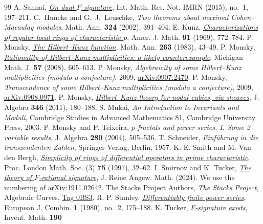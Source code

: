 \documentclass[11pt,a4paper,reqno]{amsart}
\numberwithin{equation}{section}
\theoremstyle{plain}
\begin{document}
\begin{thebibliography}{99}
A. Sannai, \href{https://doi.org/10.1093/imrn/rnt162}{\emph{On dual $F$-signature}}, Int. Math. Res. Not. IMRN (2015), no.~1, 197--211.
C.~Huneke and G.~J.~Leuschke, \emph{Two theorems about maximal Cohen--Macaulay modules},
Math. Ann. \textbf{324} (2002), 391--404.
E. Kunz, \href{https://doi.org/10.2307/2373351}{\emph{Characterizations of regular local rings of characteristic $p$}}, Amer. J. Math. \textbf{91} (1969), 772--784.
P. Monsky, \href{https://doi.org/10.1007/BF01457082}{\emph{The Hilbert--Kunz function}}, Math. Ann. \textbf{263} (1983), 43--49.
P. Monsky, \href{https://doi.org/10.1307/mmj/1220879427}{\emph{Rationality of Hilbert--Kunz multiplicities: a likely counterexample}}, Michigan Math. J. \textbf{57} (2008), 605--613.
P. Monsky, \emph{Algebraicity of some Hilbert--Kunz multiplicities (modulo a conjecture)}, 2009, \href{https://arxiv.org/abs/0907.2470}{arXiv:0907.2470}.
P. Monsky, \emph{Transcendence of some Hilbert--Kunz multiplicities (modulo a conjecture)}, 2009, \href{https://arxiv.org/abs/0908.0971}{arXiv:0908.0971}.
P. Monsky, \href{https://doi.org/10.1016/j.jalgebra.2011.07.033}{\emph{Hilbert--Kunz theory for nodal cubics, via sheaves}}, J. Algebra \textbf{346} (2011), 180--188.
S. Mukai, \emph{An Introduction to Invariants and Moduli}, Cambridge Studies in Advanced Mathematics 81, Cambridge University Press, 2003.
P. Monsky and P. Teixeira, \emph{$p$-fractals and power series. I. Some 2 variable results}, J. Algebra \textbf{280} (2004), 505--536.
T. Schneider, \emph{Einf\"uhrung in die transzendenten Zahlen}, Springer-Verlag, Berlin, 1957.
K. E. Smith and M. Van den Bergh, \href{https://doi.org/10.1112/S0024611597000257}{\emph{Simplicity of rings of differential operators in prime characteristic}}, Proc. London Math. Soc. (3) \textbf{75} (1997), 32--62.
I. Smirnov and K. Tucker, \href{https://doi.org/10.1515/crelle-2024-0010}{\emph{The theory of $F$-rational signature}}, J. Reine Angew. Math. (2024). We use the numbering of \href{https://arxiv.org/abs/1911.02642}{arXiv:1911.02642}.
The Stacks Project Authors, \emph{The Stacks Project}, Algebraic Curves, \href{https://stacks.math.columbia.edu/tag/0BS3}{Tag 0BS3}.
R. P. Stanley, \href{https://doi.org/10.1016/S0195-6698(80)80051-5}{\emph{Differentiably finite power series}}, European J. Combin. \textbf{1} (1980), no.~2, 175--188.
K. Tucker, \href{https://doi.org/10.1007/s00222-012-0389-0}{\emph{F-signature exists}}, Invent. Math. \textbf{190}

\end{thebibliography}
\end{document}
